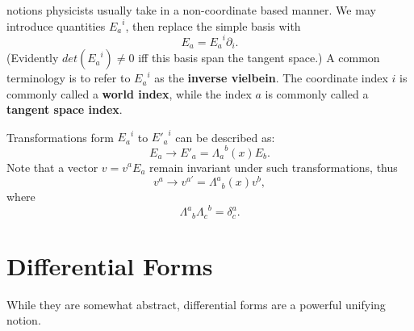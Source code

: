 \documentclass[a4paper,11pt]{article}
\theoremstyle{remark}
\begin{document}
notions physicists usually take in a non-coordinate based manner. We
may introduce quantities ${E_a}^i$, then replace the simple basis
with $$E_a = {E_a}^i\partial_i.$$ (Evidently $det({E_a}^i)\neq 0$ iff
this basis span the tangent space.) A common terminology is to refer
to ${E_a}^i$ as the \textbf{inverse vielbein}. The coordinate index
$i$ is commonly called a \textbf{world index}, while the index $a$ is
commonly called a \textbf{tangent space index}.\par
Transformations form ${E_a}^i$ to ${E'_a}^i$ can be described
as: $$E_a\rightarrow E'_a = {\Lambda_a}^b(x)E_b.$$ Note that a vector
$v = v^aE_a$ remain invariant under such transformations,
thus $$v^a\rightarrow v^{a '} = {\Lambda^a}_b(x)v^b,$$
where $${\Lambda^a}_b{\Lambda_c}^b = \delta^a_c.$$
\section{Differential Forms}
While they are somewhat abstract, differential forms are a powerful
unifying notion.
\end{document}
